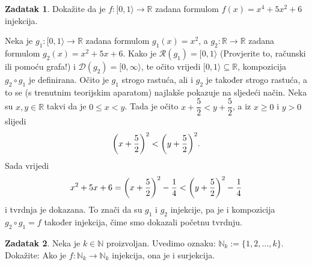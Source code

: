 \documentclass{book}
\let\originalleft\left
\let\originalright\right
\renewcommand{\left}{\mathopen{}\mathclose\bgroup\originalleft}
\renewcommand{\right}{\aftergroup\egroup\originalright}
\renewenvironment{proof}{%
    \vspace{-\parskip}\begin{oldproof}%
    }{%
    \end{oldproof}%
}
\theoremstyle{definition}
\theoremstyle{definition}
\newtheorem{exercise}{Zadatak}
\theoremstyle{remark}
\begin{document}
\begin{exercise}
Dokažite da je $f : [0, 1\rangle\to \mathbb{R}$ zadana formulom $f(x)=x^4+5x^2+6$ injekcija.
\end{exercise}
\begin{proof}[Rješenje]
Neka je $g_1 : [0, 1\rangle\to \mathbb{R}$ zadana formulom $g_1(x)=x^2$, a $g_2 : \mathbb{R}\to \mathbb{R}$ zadana formulom $g_2(x)=x^2+5x+6$. Kako je $\mathcal{R}(g_1)=[0, 1\rangle$ (Provjerite to, računski ili pomoću grafa!) i $\mathcal{D}(g_2)=[0, \infty\rangle$, te očito vrijedi $[0, 1\rangle\subseteq \mathbb{R}$, kompozicija $g_2\circ g_1$ je definirana. Očito je $g_1$ strogo rastuća, ali i $g_2$ je također strogo rastuća, a to se (s trenutnim teorijskim aparatom) najlakše pokazuje na sljedeći način. Neka su $x, y\in \mathbb{R}$ takvi da je $0\leq x<y$. Tada je očito $x+\dfrac{5}{2}<y+\dfrac{5}{2}$, a iz $x\geq 0$ i $y>0$ slijedi $$\left(x+\dfrac{5}{2}\right)^2<\left(y+\dfrac{5}{2}\right)^2.$$ Sada vrijedi
$$x^2+5x+6=\left(x+\dfrac{5}{2}\right)^2-\dfrac{1}{4}<\left(y+\dfrac{5}{2}\right)^2-\dfrac{1}{4}$$
i tvrdnja je dokazana. To znači da su $g_1$ i $g_2$ injekcije, pa je i kompozicija $g_2\circ g_1=f$ također injekcija, čime smo dokazali početnu tvrdnju.
\end{proof}
\begin{exercise}
Neka je $k\in \mathbb{N}$ proizvoljan. Uvedimo oznaku: $\mathbb{N}_k:=\{1, 2,\dots, k\}$. Dokažite: Ako je $f : \mathbb{N}_k\to \mathbb{N}_k$ injekcija, ona je i surjekcija.
\end{exercise}
\end{document}
